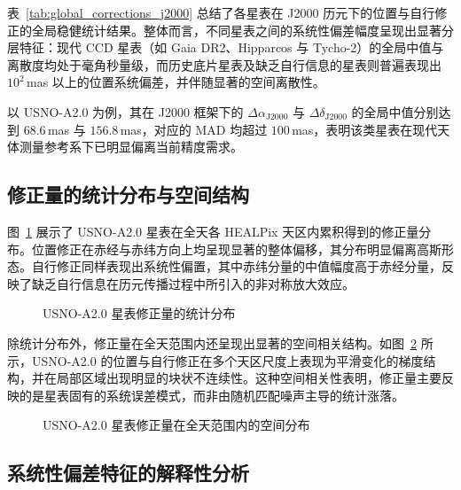 \documentclass{aastex701}
\begin{document}
表~\ref{tab:global_corrections_j2000} 总结了各星表在 J2000 历元下的位置与自行修正的全局稳健统计结果。整体而言，不同星表之间的系统性偏差幅度呈现出显著分层特征：现代 CCD 星表（如 Gaia DR2、Hipparcos 与 Tycho-2）的全局中值与离散度均处于毫角秒量级，而历史底片星表及缺乏自行信息的星表则普遍表现出 $10^2$\,mas 以上的位置系统偏差，并伴随显著的空间离散性。

以 USNO-A2.0 为例，其在 J2000 框架下的 $\Delta\alpha_{\mathrm{J2000}}$ 与 $\Delta\delta_{\mathrm{J2000}}$ 的全局中值分别达到 $68.6$\,mas 与 $156.8$\,mas，对应的 MAD 均超过 $100$\,mas，表明该类星表在现代天体测量参考系下已明显偏离当前精度需求。

\subsection{修正量的统计分布与空间结构} \label{subsec:distribution}

图~\ref{fig:hist_usnoa2} 展示了 USNO-A2.0 星表在全天各 HEALPix 天区内累积得到的修正量分布。位置修正在赤经与赤纬方向上均呈现显著的整体偏移，其分布明显偏离高斯形态。自行修正同样表现出系统性偏置，其中赤纬分量的中值幅度高于赤经分量，反映了缺乏自行信息在历元传播过程中所引入的非对称放大效应。

\begin{figure}[ht!]
\caption{USNO-A2.0 星表修正量的统计分布}
\label{fig:hist_usnoa2}
\end{figure}

除统计分布外，修正量在全天范围内还呈现出显著的空间相关结构。如图~\ref{fig:bias_usno_a2_2x2} 所示，USNO-A2.0 的位置与自行修正在多个天区尺度上表现为平滑变化的梯度结构，并在局部区域出现明显的块状不连续性。这种空间相关性表明，修正量主要反映的是星表固有的系统误差模式，而非由随机匹配噪声主导的统计涨落。

\begin{figure}[ht!]
\caption{USNO-A2.0 星表修正量在全天范围内的空间分布}
\label{fig:bias_usno_a2_2x2}
\end{figure}

\subsection{系统性偏差特征的解释性分析} \label{subsec:interpretation}
\end{document}
